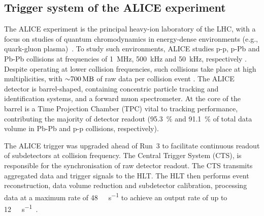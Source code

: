 \subsection{Trigger system of the ALICE experiment}
The ALICE experiment is the principal heavy-ion laboratory of the LHC, with a focus on studies of quantum chromodynamics in energy-dense environments (e.g.,  quark-gluon plasma)~\cite{alice-performance-paper-run1}. To study such environments, ALICE studies p-p, p-Pb and Pb-Pb collisions at frequencies of \SI{1}{\mega\hertz}, \SI{500}{\kilo\hertz} and \SI{50}{\kilo\hertz}, respectively \cite{alice-trigger-run3}. Despite operating at lower collision frequencies, such collisions take place at high multiplicities, with ${\sim}\SI{700}{\mega\byte}$ of raw data per collision event \cite{alice-rta-trigger}. The ALICE detector is barrel-shaped, containing concentric particle tracking and identification systems, and a forward muon spectrometer. At the core of the barrel is a Time Projection Chamber (TPC) vital to tracking performance, contributing the majority of detector readout (\SI{95.3}{\percent} and \SI{91.1}{\percent} of total data volume in Pb-Pb and p-p collisions, respectively).

The ALICE trigger was upgraded ahead of Run~3 to facilitate continuous readout of subdetectors at collision frequency. The Central Trigger System (CTS), is responsible for the synchronisation of raw detector readout. The CTS transmits aggregated data and trigger signals to the HLT. The HLT then performs event reconstruction, data volume reduction and subdetector calibration, processing data at a maximum rate of \SI{48}{\giga\byte\per\second} to achieve an output rate of up to \SI{12}{\giga\byte\per\second}~\cite{alice-rta-trigger}.
